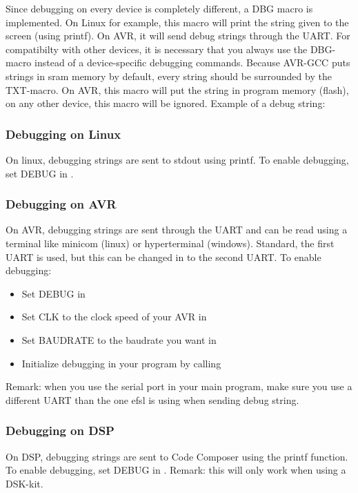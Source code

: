 Since debugging on every device is completely different, a DBG macro is 
implemented. On Linux for example, this macro will print the string given
to the screen (using printf). On AVR, it will send debug strings through the
UART. For compatibilty with other devices, it is necessary that you always use
the DBG-macro instead of a device-specific debugging commands.\newline
\newline
Because AVR-GCC puts strings in sram memory by default, every string should be
surrounded by the TXT-macro. On AVR, this macro will put the string in program
memory (flash), on any other device, this macro will be ignored.\newline
\newline
Example of a debug string:\\ 

\subsubsection{Debugging on Linux}
On linux, debugging strings are sent to stdout using printf.\newline
\newline
To enable debugging, set DEBUG in .
\subsubsection{Debugging on AVR}
On AVR, debugging strings are sent through the UART and can be read using
a terminal like minicom (linux) or hyperterminal (windows). Standard, the
first UART is used, but this can be changed in  to the
second UART.\newline
\newline
To enable debugging:
\begin{itemize}
	\item{Set DEBUG in }
	\item{Set CLK to the clock speed of your AVR in }
	\item{Set BAUDRATE to the baudrate you want in }
	\item{Initialize debugging in your program by calling }
\end{itemize}
Remark: when you use the serial port in your main program, make sure you
use a different UART than the one efsl is using when sending debug string.
\subsubsection{Debugging on DSP}
On DSP, debugging strings are sent to Code Composer using the printf function.
\newline\newline
To enable debugging, set DEBUG in .\newline
\newline
Remark: this will only work when using a DSK-kit.
